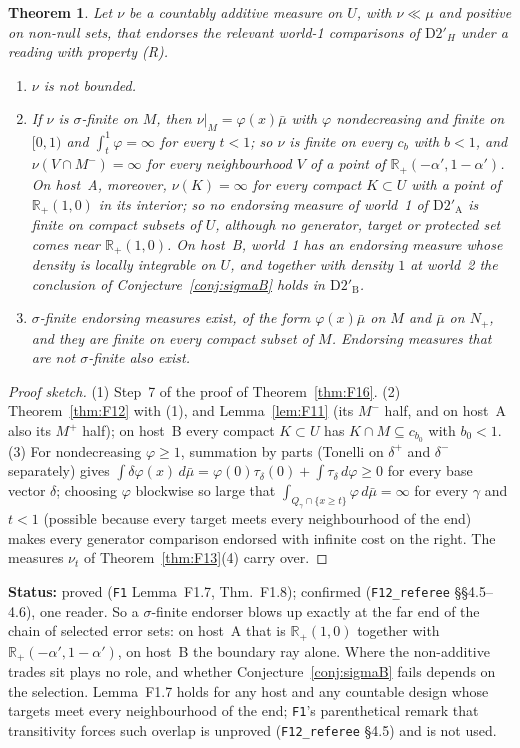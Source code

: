 \documentclass[11pt]{article}
\newtheorem{theorem}{Theorem}[section]
\theoremstyle{definition}
\theoremstyle{remark}
\newcommand{\R}{\mathbb R}
\newcommand{\src}[1]{\texttt{#1}}
\newcommand{\status}[1]{\par\smallskip\noindent\textbf{Status:} #1\par\smallskip}
\begin{document}
\begin{theorem}\label{thm:F18}
Let $\nu$ be a countably additive measure on $U$, with $\nu\ll\mu$ and positive on non-null sets, that endorses the relevant world-1 comparisons of $\mathrm{D2}'_H$ under a reading with property (R).
\begin{enumerate}[leftmargin=*,label=(\arabic*)]
\item $\nu$ is not bounded.
\item If $\nu$ is $\sigma$-finite on $M$, then $\nu|_M=\varphi(x)\bar\mu$ with $\varphi$ nondecreasing and finite on $[0,1)$ and $\int_t^1\varphi=\infty$ for every $t<1$; so $\nu$ is finite on every $c_b$ with $b<1$, and $\nu(V\cap M^-)=\infty$ for every neighbourhood $V$ of a point of $\R_+(-\alpha',1-\alpha')$. On host~A, moreover, $\nu(K)=\infty$ for every compact $K\subset U$ with a point of $\R_+(1,0)$ in its interior; so no endorsing measure of world~1 of $\mathrm{D2}'_{\mathrm A}$ is finite on compact subsets of $U$, although no generator, target or protected set comes near $\R_+(1,0)$. On host~B, world~1 has an endorsing measure whose density is locally integrable on $U$, and together with density $1$ at world~2 the conclusion of Conjecture~\ref{conj:sigmaB} holds in $\mathrm{D2}'_{\mathrm B}$.
\item $\sigma$-finite endorsing measures exist, of the form $\varphi(x)\bar\mu$ on $M$ and $\bar\mu$ on $N_+$, and they are finite on every compact subset of $M$. Endorsing measures that are not $\sigma$-finite also exist.
\end{enumerate}
\end{theorem}
\begin{proof}[Proof sketch]
(1) Step~7 of the proof of Theorem~\ref{thm:F16}. (2) Theorem~\ref{thm:F12} with (1), and Lemma~\ref{lem:F11} (its $M^-$ half, and on host~A also its $M^+$ half); on host~B every compact $K\subset U$ has $K\cap M\subseteq c_{b_0}$ with $b_0<1$. (3) For nondecreasing $\varphi\ge1$, summation by parts (Tonelli on $\delta^+$ and $\delta^-$ separately) gives $\int\delta\varphi(x)\,d\bar\mu=\varphi(0)\tau_\delta(0)+\int\tau_\delta\,d\varphi\ge0$ for every base vector $\delta$; choosing $\varphi$ blockwise so large that $\int_{Q_\gamma\cap\{x\ge t\}}\varphi\,d\bar\mu=\infty$ for every $\gamma$ and $t<1$ (possible because every target meets every neighbourhood of the end) makes every generator comparison endorsed with infinite cost on the right. The measures $\nu_t$ of Theorem~\ref{thm:F13}(4) carry over.
\end{proof}
\status{proved (\src{F1} Lemma~F1.7, Thm.~F1.8); confirmed (\src{F12\_referee} \S\S4.5--4.6), one reader. So a $\sigma$-finite endorser blows up exactly at the far end of the chain of selected error sets: on host~A that is $\R_+(1,0)$ together with $\R_+(-\alpha',1-\alpha')$, on host~B the boundary ray alone. Where the non-additive trades sit plays no role, and whether Conjecture~\ref{conj:sigmaB} fails depends on the selection. Lemma~F1.7 holds for any host and any countable design whose targets meet every neighbourhood of the end; \src{F1}'s parenthetical remark that transitivity forces such overlap is unproved (\src{F12\_referee} \S4.5) and is not used.}
\end{document}
